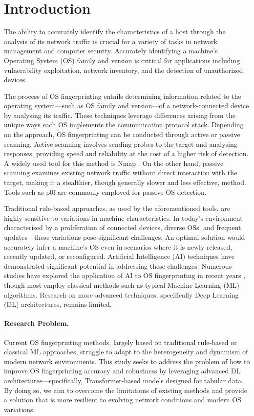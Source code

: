 \section{Introduction}
\label{sec:intro}

The ability to accurately identify the characteristics of a host through the analysis of its network traffic is crucial for a variety of tasks in network management and computer security. Accurately identifying a machine’s Operating System (OS) family and version is critical for applications including vulnerability exploitation, network inventory, and the detection of unauthorized devices.

The process of OS fingerprinting entails determining information related to the operating system—such as OS family and version—of a network-connected device by analysing its traffic. These techniques leverage differences arising from the unique ways each OS implements the communication protocol stack. Depending on the approach, OS fingerprinting can be conducted through active or passive scanning. Active scanning involves sending probes to the target and analysing responses, providing speed and reliability at the cost of a higher risk of detection. A widely used tool for this method is Nmap \cite{nmaporg_nmap_nodate}. On the other hand, passive scanning examines existing network traffic without direct interaction with the target, making it a stealthier, though generally slower and less effective, method. Tools such as p0f \cite{zalewski_p0f_nodate} are commonly employed for passive OS detection.

Traditional rule-based approaches, as used by the aforementioned tools, are highly sensitive to variations in machine characteristics. In today’s environment—characterised by a proliferation of connected devices, diverse OSs, and frequent updates—these variations pose significant challenges. An optimal solution would accurately infer a machine's OS even in scenarios where it is newly released, recently updated, or reconfigured. Artificial Intelligence (AI) techniques have demonstrated significant potential in addressing these challenges. Numerous studies have explored the application of AI to OS fingerprinting in recent years \cite{lastovicka_passive_2023}, though most employ classical methods such as typical Machine Learning (ML) algorithms. Research on more advanced techniques, specifically Deep Learning (DL) architectures, remains limited.

\paragraph{Research Problem.} Current OS fingerprinting methods, largely based on traditional rule-based or classical ML approaches, struggle to adapt to the heterogeneity and dynamism of modern network environments. This study seeks to address the problem of how to improve OS fingerprinting accuracy and robustness by leveraging advanced DL architectures—specifically, Transformer-based models designed for tabular data. By doing so, we aim to overcome the limitations of existing methods and provide a solution that is more resilient to evolving network conditions and modern OS variations.

